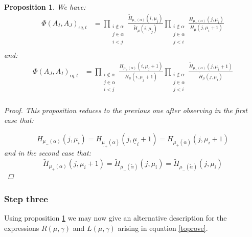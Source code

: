 \documentclass[12pt,dvips]{amsart}
\newtheorem{proposition}{Proposition}[section]
\begin{document}
\begin{proposition}\label{fish}
We have:
\begin{align*}
\Phi(A_I,A_J)_{\epsilon q, t} &= \prod_{\substack{i \not\in \alpha \\ j \in \alpha \\ i < j}} \frac{\tilde{H}_{\mu_-(\alpha)}(i,\mu_j)}{\tilde{H}_\mu(i,\mu_j)}
\prod_{\substack{i \not\in \alpha \\ j \in \alpha \\ j < i}} \frac{H_{\mu_-(\alpha)}(j,\mu_i)}{H_\mu(j,\mu_i+1)}\\
\end{align*}
and:
\begin{align*}
\Phi(A_J,A_I)_{\epsilon q, t} &= \prod_{\substack{i \not\in \alpha \\ j \in \alpha \\ i < j}} \frac{H_{\mu_+(\alpha)}(i,\mu_j+1)}{H_\mu(i,\mu_j+1)} 
\prod_{\substack{i \not\in \alpha \\ j \in \alpha \\ j < i}} \frac{\tilde{H}_{\mu_+(\alpha)}(j,\mu_i+1)}{\tilde{H}_\mu(j,\mu_i)} \\
\end{align*}
\begin{proof}
This proposition reduces to the previous one after observing in the first case that:

$$ H_{\mu_-(\alpha)}(j,\mu_i) =H _{\underline{\mu}_+(\tilde{\alpha})}(j,\underline{\mu}_i+1) = H_{\mu_+(\tilde{\alpha})}(j,\mu_i+1)$$
and in the second case that:
$$ \tilde{H}_{\mu_+(\alpha)}(j,\mu_i+1) = \tilde{H}_{\overline{\mu}_-(\tilde{\alpha})}(j,\overline{\mu}_i) = \tilde{H}_{{\mu}_-(\tilde{\alpha})}(j,{\mu}_i)$$
\qedhere
\end{proof}
\end{proposition}

\subsubsection{Step three}

Using proposition \ref{fish} we may now give an alternative description for the expressions $R(\mu,\gamma)$ and $L(\mu,\gamma)$ arising in equation \eqref{toprove}. 
\end{document}
